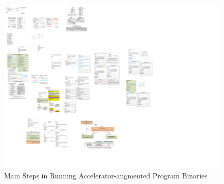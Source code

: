 



\begin{figure}[htp]
\begin{center}
\includegraphics[width=0.9\linewidth]{chap6fig/mainStepsExecution.pdf}
\caption{Main Steps in Running Accelerator-augmented Program Binaries
\label{pieces-doModel-doOnline-doInvoke}}
\end{center}
\end{figure}


